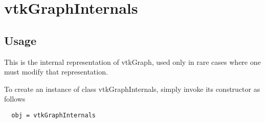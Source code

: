 \section{vtkGraphInternals}

\subsection{Usage}

 This is the internal representation of vtkGraph, used only in rare cases 
 where one must modify that representation.

To create an instance of class vtkGraphInternals, simply
invoke its constructor as follows
\begin{verbatim}
  obj = vtkGraphInternals
\end{verbatim}

